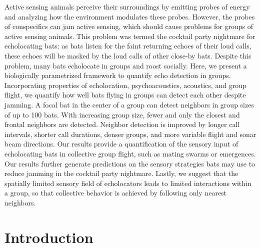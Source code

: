 \documentclass[
]{book}
\begin{document}
Active sensing animals perceive their surroundings by emitting probes of energy and analyzing how the environment modulates these probes. However, the probes of conspecifics can jam active sensing, which should cause problems for groups of active sensing animals. This problem was termed the cocktail party nightmare for echolocating bats: as bats listen for the faint returning echoes of their loud calls, these echoes will be masked by the loud calls of other close-by bats. Despite this problem, many bats echolocate in groups and roost socially. Here, we present a biologically parametrized framework to quantify echo detection in groups. Incorporating properties of echolocation, psychoacoustics, acoustics, and group flight, we quantify how well bats flying in groups can detect each other despite jamming. A focal bat in the center of a group can detect neighbors in group sizes of up to 100 bats. With increasing group size, fewer and only the closest and frontal neighbors are detected. Neighbor detection is improved by longer call intervals, shorter call durations, denser groups, and more variable flight and sonar beam directions. Our results provide a quantification of the sensory input of echolocating bats in collective group flight, such as mating swarms or emergences. Our results further generate predictions on the sensory strategies bats may use to reduce jamming in the cocktail party nightmare. Lastly, we suggest that the spatially limited sensory field of echolocators leads to limited interactions within a group, so that collective behavior is achieved by following only nearest neighbors.

\newpage

\hypertarget{introduction}{%
\section{Introduction}\label{introduction}}
\end{document}

